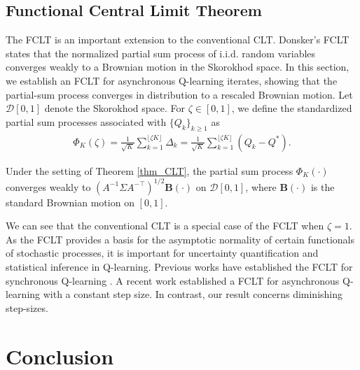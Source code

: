 \documentclass{opt2025} %
\begin{document}
\subsection{Functional Central Limit Theorem}


The FCLT is an important extension to the conventional CLT. Donsker’s FCLT \citep{donsker1951invariance} states that the normalized partial sum process of i.i.d. random variables converges weakly to a Brownian motion in the Skorokhod space. In this section, we establish an FCLT for asynchronous Q-learning iterates, showing that the partial-sum process converges in distribution to a rescaled Brownian motion. Let $\mathcal{D}[0,1]$ denote the Skorokhod space. For $\zeta \in [0,1]$, we define the standardized partial sum processes associated with $\{ Q_k \}_{k\geq 1}$ as
\begin{align*}
\Phi_{K}(\zeta) = \frac{1}{\sqrt{K}}\sum_{k=1}^{\lfloor \zeta K \rfloor} \Delta_k = \frac{1}{\sqrt{K}}\sum_{k=1}^{\lfloor \zeta K \rfloor} (Q_k - Q^*).
\end{align*}



\begin{theorem}
\label{thm_FCLT}
Under the setting of Theorem \ref{thm_CLT}, the partial sum process $\Phi_{K}(\cdot)$ converges weakly to $(A^{-1}\Sigma A^{-\top})^{1/2} \textbf{B}(\cdot)$ on $\mathcal{D}[0,1]$, where $\textbf{B}(\cdot)$ is the standard Brownian motion on $[0,1]$.
\end{theorem}
We can see that the conventional CLT is a special case of the FCLT when $\zeta=1$. As the FCLT provides a basis for the asymptotic normality of certain functionals of stochastic processes, it is important for uncertainty quantification and statistical inference in Q-learning. Previous works have established the FCLT for synchronous Q-learning \citep{xie2022statistical, li2023statistical, panda2025asymptotic}. A recent work \citep{zhang2024constant} established a FCLT for asynchronous Q-learning with a constant step size. In contrast, our result concerns diminishing step-sizes.



\section{Conclusion}
\end{document}
